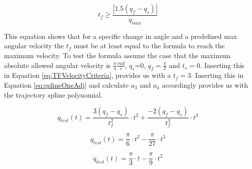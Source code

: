 \begin{equation}
    t_f \geq \frac{|1.5(q_f-q_s)|}{\dot{q}_{max}}
    \label{eq:TFVelocityCriteria}
\end{equation}

This equation shows that for a specific change in angle and a predefined max angular velocity the $t_f$ must be at least equal to the formula to reach the maximum velocity. 
To test the formula assume the case that the maximum absolute allowed angular velocity is $\frac{\pi}{4}\frac{rad}{s}$, $q_s$=0, $q_f=\frac{\pi}{2}$ and $t_s=0$. Inserting this in Equation \ref{eq:TFVelocityCriteria}, provides us with a $t_f=3$. Inserting this in Equation \ref{eq:splineOneAdj} and calculate $a_3$ and $a_4$ accordingly provides us with the trajectory spline polynomial. 



\begin{equation}
    q_{test}(t) =  \frac{3(q_{f}-q_{s})}{t_{f}^2} \cdot t^2 + \frac{-2(q_{f}-q_{s})}{t_{f}^3}\cdot t^3
    \label{eq:SplineTrajExample}
\end{equation}

\begin{equation}
    q_{test}(t) =  \frac{\pi}{6} \cdot t^2 - \frac{\pi}{27}\cdot t^3
    \label{eq:SplineTrajExample}
\end{equation}

\begin{equation}
    \dot{q}_{test}(t) =  \frac{\pi}{3} \cdot t - \frac{\pi}{9}\cdot t^2
    \label{eq:SplineTrajExample}
\end{equation}

